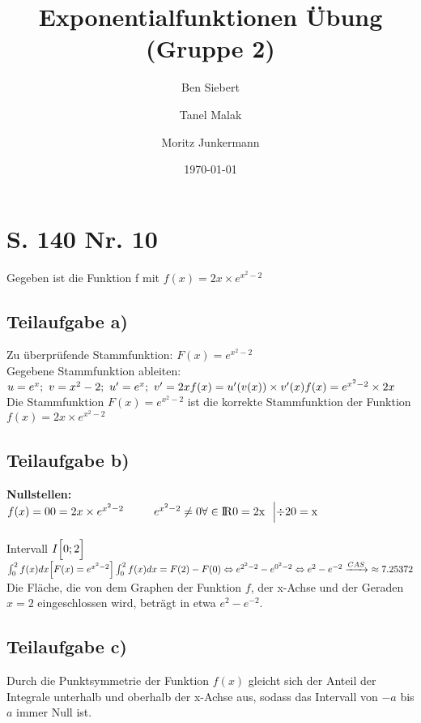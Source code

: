 \documentclass[11pt, a4paper]{report}
\begin{document}
	\title{Exponentialfunktionen Übung (Gruppe 2)}
	\author{Ben Siebert \and Tanel Malak \and Moritz Junkermann}
	\date{\today}
	\maketitle
	\tableofcontents
	\bsremovechaptertitle
	\chapter{S. 140 Nr. 10}
	Gegeben ist die Funktion f mit $f(x) = 2x \times e^{x^2-2}$
	\section{Teilaufgabe a)}
	Zu überprüfende Stammfunktion: $F(x) = e^{x^2-2}$ \\
	Gegebene Stammfunktion ableiten: \\
	$u = e^x;\ v = x^2 - 2;\ u' = e^x;\ v' = 2x\\
	f(x) = u'(v(x)) \times v'(x) \\
	f(x) = e^{x^2 - 2} \times 2x \\
	$
	Die Stammfunktion $F(x) = e^{x^2-2}$ ist die korrekte Stammfunktion der Funktion $f(x) = 2x \times e^{x^2-2}$
	\section{Teilaufgabe b)}
	\textbf{Nullstellen:} \\
	$f(x) = 0 \\
	0 = 2x \times e^{x^2-2}\ \ \ \ \ \ \ \ e^{x^2-2} \ne 0 \forall \in \rm I\!R \\
	0 = 2x\ \ \Bigl|\div 2 \\
	0 = x
	$ \\ \\
	Intervall $I\Bigl[0;2\Bigl]$ \\
	$
	\int_{0}^{2}f(x) dx \Bigl[F(x) = e^{x^2-2}\Bigl]\\
	\int_{0}^{2}f(x) dx = F(2) - F(0) \\
	\Leftrightarrow e^{2^2-2} - e^{0^2-2} \\
	\Leftrightarrow e^{2} - e^{-2} \\
	\xrightarrow[]{CAS}\ \approx 7.25372 \\
	$
	Die Fläche, die von dem Graphen der Funktion $f$, der x-Achse und der Geraden $x=2$ eingeschlossen wird, beträgt in etwa $e^2 - e^{-2}$.
	\section{Teilaufgabe c)}
	Durch die Punktsymmetrie der Funktion $f(x)$ gleicht sich der Anteil der Integrale unterhalb und oberhalb der x-Achse aus, sodass das Intervall von $-a$ bis $a$ immer Null ist.
\end{document}
